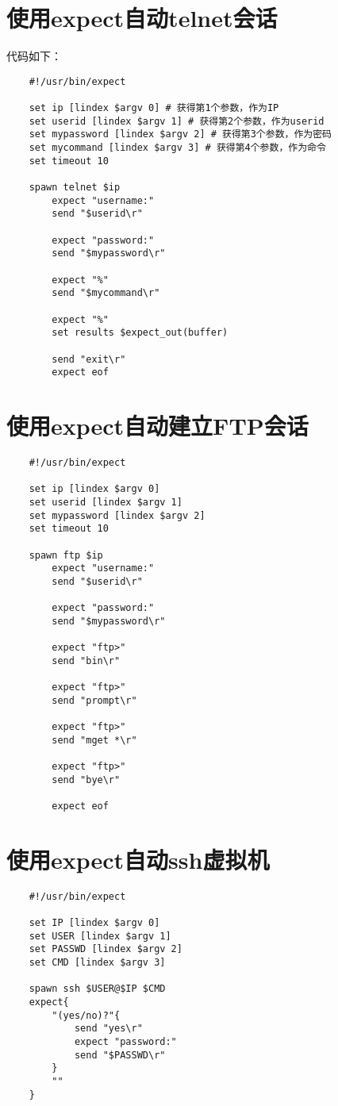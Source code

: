 \documentclass[a4paper,left=2.5cm,right=2.5cm,11pt]{article}
\begin{document}
\section{使用expect自动telnet会话}
	代码如下：
	\begin{lstlisting}
	#!/usr/bin/expect

	set ip [lindex $argv 0] # 获得第1个参数，作为IP
	set userid [lindex $argv 1] # 获得第2个参数，作为userid
	set mypassword [lindex $argv 2] # 获得第3个参数，作为密码
	set mycommand [lindex $argv 3] # 获得第4个参数，作为命令
	set timeout 10

	spawn telnet $ip
		expect "username:"
		send "$userid\r"

		expect "password:"
		send "$mypassword\r"

		expect "%"
		send "$mycommand\r"

		expect "%"
		set results $expect_out(buffer)

		send "exit\r"
		expect eof
	\end{lstlisting}

\section{使用expect自动建立FTP会话}
	\begin{lstlisting}
	#!/usr/bin/expect

	set ip [lindex $argv 0]
	set userid [lindex $argv 1]
	set mypassword [lindex $argv 2]
	set timeout 10

	spawn ftp $ip
		expect "username:"
		send "$userid\r"

		expect "password:"
		send "$mypassword\r"

		expect "ftp>"
		send "bin\r"

		expect "ftp>"
		send "prompt\r"

		expect "ftp>"
		send "mget *\r"

		expect "ftp>"
		send "bye\r"

		expect eof
	\end{lstlisting}

\section{使用expect自动ssh虚拟机}
	\begin{lstlisting}
	#!/usr/bin/expect

	set IP [lindex $argv 0]
	set USER [lindex $argv 1]
	set PASSWD [lindex $argv 2]
	set CMD [lindex $argv 3]

	spawn ssh $USER@$IP $CMD
	expect{
		"(yes/no)?"{
			send "yes\r"
			expect "password:"
			send "$PASSWD\r"
		}
		""
	}
	\end{lstlisting}
\end{document}
